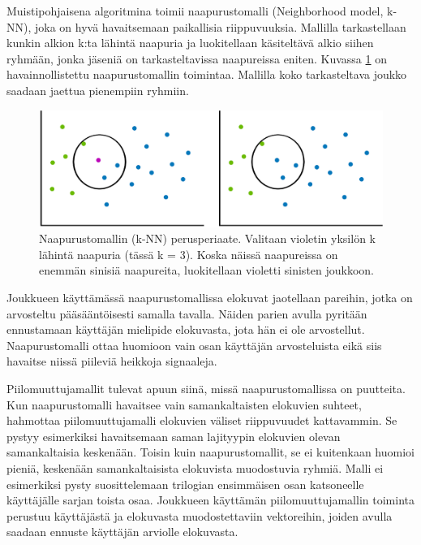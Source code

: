 \documentclass[12pt,finnish]{tktltiki2}
\theoremstyle{definition}
\theoremstyle{remark}
\begin{document}
        Muistipohjaisena algoritmina toimii naapurustomalli (Neighborhood model, k-NN), joka on hyvä havaitsemaan paikallisia riippuvuuksia. Mallilla tarkastellaan kunkin alkion k:ta lähintä naapuria ja luokitellaan käsiteltävä alkio siihen ryhmään, jonka jäseniä on tarkasteltavissa naapureissa eniten. Kuvassa \ref{knn} on havainnollistettu naapurustomallin toimintaa. Mallilla koko tarkasteltava joukko saadaan jaettua pienempiin ryhmiin.
        
\begin{figure}[]
\includegraphics[width = 370pt]{knnkumpikin.eps}\caption{Naapurustomallin (k-NN) perusperiaate. Valitaan violetin yksilön k lähintä naapuria (tässä k = 3). Koska näissä naapureissa on enemmän sinisiä naapureita, luokitellaan violetti sinisten joukkoon.}
\label{knn}
\end{figure} 
 
Joukkueen käyttämässä naapurustomallissa elokuvat jaotellaan pareihin, jotka on arvosteltu pääsääntöisesti samalla tavalla. Näiden parien avulla pyritään ennustamaan käyttäjän mielipide elokuvasta, jota hän ei ole arvostellut. Naapurustomalli ottaa huomioon vain osan käyttäjän arvosteluista eikä siis havaitse niissä piileviä heikkoja signaaleja. 

	Piilomuuttujamallit tulevat apuun siinä, missä naapurustomallissa on puutteita. Kun naapurustomalli havaitsee vain samankaltaisten elokuvien suhteet, hahmottaa piilomuuttujamalli elokuvien väliset riippuvuudet kattavammin. Se pystyy esimerkiksi havaitsemaan saman lajityypin elokuvien olevan samankaltaisia keskenään. Toisin kuin naapurustomallit, se ei kuitenkaan huomioi pieniä, keskenään samankaltaisista elokuvista muodostuvia ryhmiä. Malli ei esimerkiksi pysty suosittelemaan trilogian ensimmäisen osan katsoneelle käyttäjälle sarjan toista osaa. Joukkueen käyttämän piilomuuttujamallin toiminta perustuu käyttäjästä ja elokuvasta muodostettaviin vektoreihin, joiden avulla saadaan ennuste käyttäjän arviolle elokuvasta.
        
\end{document}
